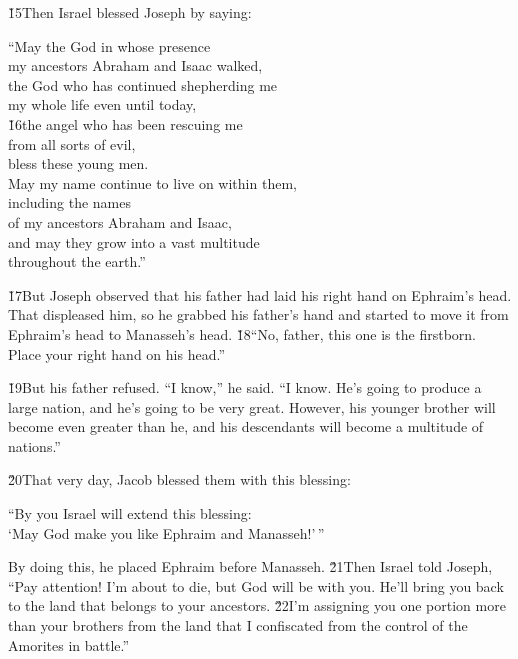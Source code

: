\v{15}Then Israel blessed Joseph by saying:

\begin{poetry}
\poeml ``May the God in whose presence \\
\poemll    my ancestors Abraham and Isaac walked, \\
\poeml the God who has continued shepherding me \\
\poemll    my whole life even until today, \\
\poeml \v{16}the angel who has been rescuing me \\
\poemll    from all sorts of evil, \\
\poemlll       bless these young men. \\
\poeml May my name continue to live on within them, \\
\poemll    including the names \\
\poemlll       of my ancestors Abraham and Isaac, \\
\poeml and may they grow into a vast multitude \\
\poemll    throughout the earth.''
\end{poetry}

\v{17}But Joseph observed that his father had laid his right hand on Ephraim's head. That displeased him, so he grabbed his father's hand and started to move it from Ephraim's head to Manasseh's head. \v{18}``No, father, this one is the firstborn. Place your right hand on his head.''

\v{19}But his father refused. ``I know,'' he said. ``I know. He's going to produce a large nation, and he's going to be very great. However, his younger brother will become even greater than he, and his descendants will become a multitude of nations.''

\v{20}That very day, Jacob blessed them with this blessing:

\begin{poetry}
\poeml ``By you Israel will extend this blessing: \\
\poemll    `May God make you like Ephraim and Manasseh!'\,''
\end{poetry}

By doing this, he placed Ephraim before Manasseh. \v{21}Then Israel told Joseph, ``Pay attention! I'm about to die, but God will be with you. He'll bring you back to the land that belongs to your ancestors. \v{22}I'm assigning you one portion more than your brothers from the land that I confiscated from the control of the Amorites in battle.''

